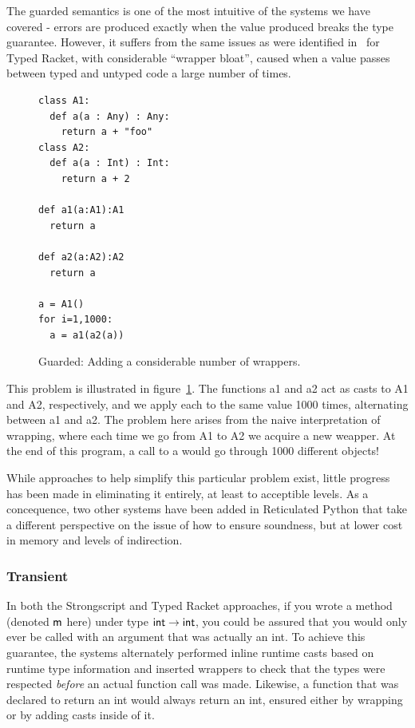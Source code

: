 \documentclass[a4paper,USenglish]{tex/lipics-v2016}
\begin{document}
The guarded semantics is one of the most intuitive of the systems we have
covered - errors are produced exactly when the value produced breaks the
type guarantee. However, it suffers from the same issues as were identified
in~\cite{practical-gt} for Typed Racket, with considerable ``wrapper
bloat'', caused when a value passes between typed and untyped code a large
number of times.

\begin{figure}[h]
\begin{verbatim}
class A1:
  def a(a : Any) : Any:
    return a + "foo"
class A2:
  def a(a : Int) : Int:
    return a + 2

def a1(a:A1):A1
  return a

def a2(a:A2):A2
  return a

a = A1()
for i=1,1000:
  a = a1(a2(a))
\end{verbatim}
\caption{Guarded: Adding a considerable number of wrappers.}
\label{fig:guard3}
\end{figure}

This problem is illustrated in figure~\ref{fig:guard3}. The functions a1 and
a2 act as casts to A1 and A2, respectively, and we apply each to the same
value 1000 times, alternating between a1 and a2. The problem here arises
from the naive interpretation of wrapping, where each time we go from A1 to
A2 we acquire a new weapper. At the end of this program, a call to a would
go through 1000 different objects!

While approaches to help simplify this particular problem exist, little
progress has been made in eliminating it entirely, at least to acceptible
levels. As a concequence, two other systems have been added in Reticulated
Python that take a different perspective on the issue of how to ensure
soundness, but at lower cost in memory and levels of indirection.

\subsubsection{Transient}

In both the Strongscript and Typed Racket approaches, if you wrote a method
(denoted ${\sf{m}}$ here) under type ${\sf{int}} \rightarrow {\sf{int}}$, you could be
assured that you would only ever be called with an argument that was
actually an int. To achieve this guarantee, the systems alternately
performed inline runtime casts based on runtime type information and
inserted wrappers to check that the types were respected \emph{before} an
actual function call was made. Likewise, a function that was declared to
return an int would always return an int, ensured either by wrapping or by
adding casts inside of it.
\end{document}
